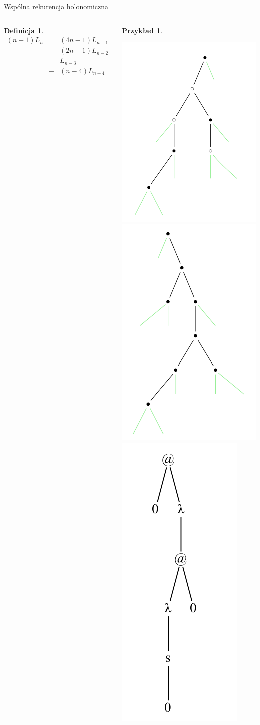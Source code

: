 \documentclass[final]{beamer}
\theoremstyle{bluetheorem}
\theoremstyle{bluetheorem}
\newtheorem{mydefinition}[mytheorem]{Definicja}
\theoremstyle{greentheorem}
\newtheorem{myexample}[mytheorem]{Przykład}
\begin{document}
\begin{frame}{Wspólna rekurencja holonomiczna}
    \begin{columns}
        \begin{mydefinition}
            \[\begin{array}{rcl}
                (n + 1)L_n &=& (4n - 1)L_{n-1}\\
                           &-& (2n - 1)L_{n-2}\\
                           &-& L_{n-3}\\
                           &-& (n - 4)L_{n-4}
            \end{array}\]
        \end{mydefinition}

        \begin{myexample}
            \begin{center}
                \includegraphics[width=.4\textwidth]{bw_001.png}%
                \includegraphics[width=.4\textwidth]{zigzag_001.png}%
                \includegraphics[width=.2\textwidth]{lambda_001.png}

\end{center}
\end{myexample}
\end{columns}
\end{frame}
\end{document}
